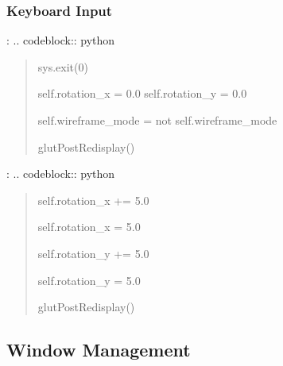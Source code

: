\documentclass[a4paper,10pt,english,openany,oneside]{sphinxmanual}
\begin{document}
\subsubsection{Keyboard Input}
\label{\detokenize{api/ui:keyboard-input}}
\sphinxAtStartPar
{}:
.. code\sphinxhyphen{}block:: python
\begin{quote}
\begin{description}
\begin{description}
\sphinxAtStartPar
sys.exit(0)

\sphinxAtStartPar
self.rotation\_x = 0.0
self.rotation\_y = 0.0

\sphinxAtStartPar
self.wireframe\_mode = not self.wireframe\_mode

\end{description}

\sphinxAtStartPar
glutPostRedisplay()

\end{description}
\end{quote}

\sphinxAtStartPar
{}:
.. code\sphinxhyphen{}block:: python
\begin{quote}
\begin{description}
\begin{description}
\sphinxAtStartPar
self.rotation\_x += 5.0

\sphinxAtStartPar
self.rotation\_x \sphinxhyphen{}= 5.0

\sphinxAtStartPar
self.rotation\_y += 5.0

\sphinxAtStartPar
self.rotation\_y \sphinxhyphen{}= 5.0

\end{description}

\sphinxAtStartPar
glutPostRedisplay()

\end{description}
\end{quote}


\subsection{Window Management}
\label{\detokenize{api/ui:window-management}}
\end{document}
